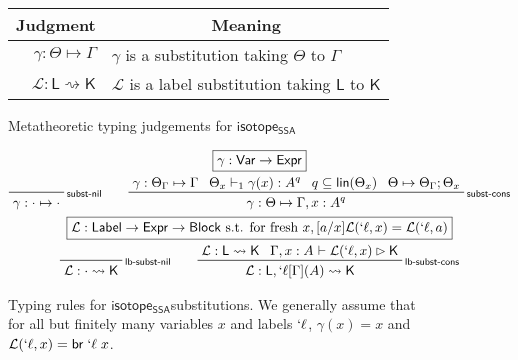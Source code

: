 \documentclass[acmsmall,screen,review]{acmart}
\newcommand{\mc}[1]{\ensuremath{\mathcal{#1}}}
\newcommand{\ms}[1]{\ensuremath{\mathsf{#1}}}
\newcommand{\lbl}[1]{{`#1}}
\newcommand{\brb}[2]{\ms{br}\;#1\;#2}
\newcommand{\lbrb}[2]{\brb{\lbl{#1}}{#2}}
\newcommand{\csplits}[3]{#1 \mapsto #2;#3}
\newcommand{\tlin}[2]{#2 \subseteq \ms{lin}(#1)}
\newcommand{\thyp}[3]{#1: {#2}^{#3}}
\newcommand{\lhyp}[3]{#1[#2](#3)}
\newcommand{\llhyp}[3]{\lhyp{\lbl{#1}}{#2}{#3}}
\newcommand{\rle}[1]{{\scriptsize\textsf{#1}}}
\newcommand{\hasty}[5]{#1 \vdash_{#2} #3: {#4}^{#5}}
\newcommand{\haslb}[3]{#1 \vdash #2 \rhd #3}
\newcommand{\issubst}[3]{#1: #2 \mapsto #3}
\newcommand{\lbsubst}[3]{#1: #2 \rightsquigarrow #3}
\newcommand{\mhole}[1]{{#1}^?}
\newcommand{\mhasty}[6]{#1;#2 \vdash_{#3} #4: {#5}^{#6}}
\newcommand{\mhaslb}[4]{#1;#2 \vdash #3 \rhd #4}
\newcommand{\mlhaslb}[4]{#1;#2 \vdash #3 \rhd #4}
\newcommand{\isrw}[3]{#1: #2 \mapsto #3}
\newcommand{\isotopessa}{\ms{isotope_{SSA}}}
\begin{document}
\begin{figure}
  \begin{center}        
    \begingroup
    \renewcommand{\arraystretch}{1.5}
    \setlength{\tabcolsep}{2em}
    \begin{tabular}{rl}
        \multicolumn{1}{c}{Judgment} & \multicolumn{1}{c}{Meaning} \\ \hline
        \(\issubst{\gamma}{\Theta}{\Gamma}\) &
        \(\gamma\) is a substitution taking \(\Theta\) to \(\Gamma\) \\
        \(\lbsubst{\mc{L}}{\ms{L}}{\ms{K}}\) &
        \(\mc{L}\) is a label substitution taking \(\ms{L}\) to \(\ms{K}\) \\
    \end{tabular}
    \endgroup
  \end{center}
  \caption{Metatheoretic typing judgements for \isotopessa}
  \label{fig:ssa-meta-judgements}
\end{figure}

\begin{figure}
  \begin{gather*}
    \boxed{\gamma: \ms{Var} \to \ms{Expr}}
    \\
    \prftree[r]{\rle{subst-nil}}
      {\issubst{\gamma}{\cdot}{\cdot}}
      \qquad
    \prftree[r]{\rle{subst-cons}}
      {\issubst{\gamma}{\Theta_\Gamma}{\Gamma}}
      {\hasty{\Theta_x}{1}{\gamma(x)}{A}{q}}
      {\tlin{\Theta_x}{q}}
      {\csplits{\Theta}{\Theta_\Gamma}{\Theta_x}}
      {\issubst{\gamma}{\Theta}{\Gamma, \thyp{x}{A}{q}}}
    \\
    \boxed{\mc{L}: \ms{Label} \to \ms{Expr} \to \ms{Block} \text{ s.t. for fresh } x, [a/x]\mc{L}(\lbl{\ell}, x) = \mc{L}(\lbl{\ell}, a)}
    \\
    \prftree[r]{\rle{lb-subst-nil}}
    {\lbsubst{\mc{L}}{\cdot}{\ms{K}}}
      \qquad
    \prftree[r]{\rle{lb-subst-cons}}
      {\lbsubst{\mc{L}}{\ms{L}}{\ms{K}}}
      {\haslb{\Gamma, \thyp{x}{A}{}}{\mc{L}(\lbl{\ell}, x)}{\ms{K}}}
      {\lbsubst{\mc{L}}{\ms{L}, \llhyp{\ell}{\Gamma}{A}}{\ms{K}}}
  \end{gather*}
  \caption{ Typing rules for \isotopessa substitutions. We generally assume that
    for all but finitely many variables \(x\) and labels \(\lbl{\ell}\),
    \(\gamma(x) = x\) and \(\mc{L}(\lbl{\ell}, x) = \lbrb{\ell}{x}\). }
  \label{fig:ssa-subst-typing}
\end{figure}
\end{document}
